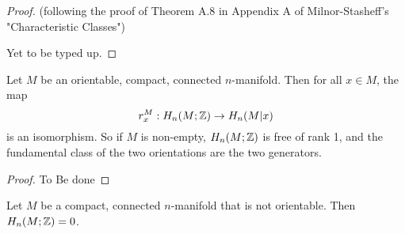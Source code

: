 \documentclass[a4paper,11pt,english]{article}
\begin{document}
\begin{proof}
(following the proof of Theorem A.8 in Appendix A of Milnor-Stasheff's
"Characteristic Classes")

Yet to be typed up.
\end{proof}

\begin{corol}
Let $M$ be an orientable, compact, connected $n$-manifold. Then for all $x\in
M$, the map 
\[ r^M_x : H_n(M;\mathbb{Z}) \to H_n(M|x) \]
is an isomorphism. So if $M$ is non-empty, $H_n(M;\mathbb{Z})$ is free of rank 1, and
the fundamental class of the two orientations are the two generators.
\end{corol}

\begin{proof}
To Be done
\end{proof}

\begin{corol}
Let $M$ be a compact, connected $n$-manifold that is not orientable. Then
$H_n(M;\mathbb{Z}) = 0$.
\end{corol}
\end{document}
